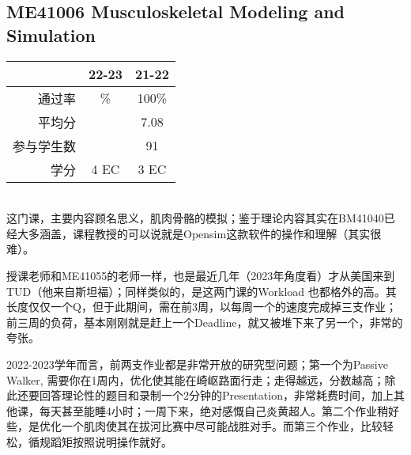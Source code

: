 \subsection{ME41006 Musculoskeletal Modeling and Simulation}\hypertarget{ME41006}{} 
\begin{minipage}{0.45\textwidth}
\centering
{}
\end{minipage}%
\begin{minipage}{0.45\textwidth}
\raggedleft
\begin{tabular}{r|c|c}
\textbf{ } & \textbf{22-23} & \textbf{21-22}\\ \hline
通过率 & \% & 100\%\\ 
平均分 &   & 7.08\\ 
参与学生数 &  & 91\\
学分 & 4 EC & 3 EC\\
\end{tabular}
\end{minipage}\\

这门课，主要内容顾名思义，肌肉骨骼的模拟；鉴于理论内容其实在BM41040已经大多涵盖，课程教授的可以说就是Opensim这款软件的操作和理解（其实很难）。

授课老师和ME41055的老师一样，也是最近几年（2023年角度看）才从美国来到TUD（他来自斯坦福）；同样类似的，是这两门课的Workload 也都格外的高。其长度仅仅一个Q，但于此期间，需在前3周，以每周一个的速度完成掉三支作业；前三周的负荷，基本刚刚就是赶上一个Deadline，就又被堆下来了另一个，非常的夸张。

2022-2023学年而言，前两支作业都是非常开放的研究型问题；第一个为Passive Walker, 需要你在1周内，优化使其能在崎岖路面行走；走得越远，分数越高；除此还要回答理论性的题目和录制一个2分钟的Presentation，非常耗费时间，加上其他课，每天甚至能睡4小时；一周下来，绝对感慨自己炎黄超人。第二个作业稍好些，是优化一个肌肉使其在拔河比赛中尽可能战胜对手。而第三个作业，比较轻松，循规蹈矩按照说明操作就好。

